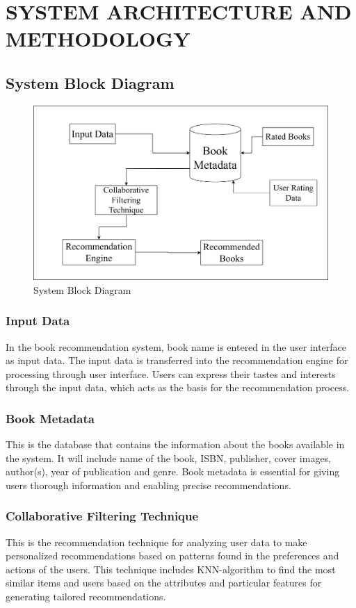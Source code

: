 \chapter{SYSTEM ARCHITECTURE AND METHODOLOGY}



\section{System Block Diagram}

\begin{figure}[H]
\centering
\includegraphics[width=0.8\linewidth]{img/Graphics/BRS_block_Diagram.drawio.png}
\caption[System Block Diagram]{System Block Diagram}
\label{fig:SystemBlockDiagram.png}

\end{figure} 
    \subsection{Input Data}
    In the book recommendation system, book name is entered in the user interface as input data. The input data is transferred into the recommendation engine for processing through user interface. Users can express their tastes and interests through the input data, which acts as the basis for the recommendation process.
    \subsection{Book Metadata}  
    This is the database that contains the information about the books available in the system. It will include name of the book, ISBN, publisher, cover images, author(s), year of publication and genre. Book metadata is essential for giving users thorough information and enabling precise recommendations.
    \subsection{Collaborative Filtering Technique} 
    This is the recommendation technique for analyzing user data to make personalized recommendations based on patterns found in the preferences and actions of the users. This technique includes KNN-algorithm to find the most similar items and users based on the attributes and particular features for generating tailored recommendations.
